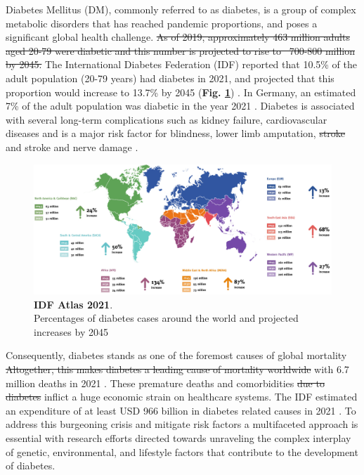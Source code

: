 Diabetes Mellitus (DM), commonly referred to as diabetes, is a group of complex metabolic disorders that has reached pandemic proportions, and poses a significant global health challenge. \st{As of 2019, approximately 463 million adults aged 20-79 were diabetic and this number is projected to rise to ~700-800 million by 2045.} The International Diabetes Federation (IDF) reported that 10.5\% of the adult population (20-79 years) had diabetes in 2021, and projected that this proportion would increase to 13.7\% by 2045 (\textbf{Fig. \ref{fig:idf}}) \cite{home_idf_nodate}. In Germany, an estimated 7\% of the adult population was diabetic in the year 2021 \cite{noauthor_germany_nodate}. Diabetes is associated with several long-term complications such as kidney failure, cardiovascular diseases and is a major risk factor for blindness, lower limb amputation, \st{stroke} and stroke and nerve damage \cite{ashcroft_diabetes_2012,emerging_risk_factors_collaboration_diabetes_2010,leon_diabetes_2015}. 

\begin{figure}[H]
\centering
\includegraphics[width=15cm]{Chapter1/Fig/F1-3-01.png}
\caption[]{\textbf{IDF Atlas 2021}.\\
Percentages of diabetes cases around the world and projected increases by 2045}
\label{fig:idf}
\end{figure}


Consequently, diabetes stands as one of the foremost causes of global mortality \st{Altogether, this makes diabetes a leading cause of mortality worldwide} with 6.7 million deaths in 2021 \cite{home_idf_nodate}. These premature deaths and comorbidities \st{due to diabetes} inflict a huge economic strain on healthcare systems. The IDF estimated an expenditure of at least USD 966 billion in diabetes related causes in 2021 \cite{home_idf_nodate}. To address this burgeoning crisis and mitigate risk factors a multifaceted approach is essential with research efforts directed towards unraveling the complex interplay of genetic, environmental, and lifestyle factors that contribute to the development of diabetes. 




